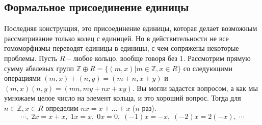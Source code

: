 \subsection{Формальное присоединение единицы}
Последняя конструкция, это присоединение единицы, которая делает возможным
рассматривание только колец с единицей. Но в действительности не все
гомоморфизмы переводят единицы в единицы, с чем сопряжены некоторые проблемы.
Пусть $R$ – любое кольцо, вообще говоря без 1. Рассмотрим прямую сумму абелевых
групп $\mathbb{Z}\oplus R=\{(m,x)|m\in\mathbb{Z},x\in R\}$ со следующими
операциями $(m,x)+(n,y)=(m+n,x+y)$ и $(m,x)(n,y)=(mn, my+nx+xy)$. Вы могли
задастся вопросом, а как мы умножаем целое число на элемент кольца, и это
хороший вопрос. Тогда для $n\in\mathbb{Z},x\in R$ определим $nx=x+\ldots+x$ ($n$
раз). 
\[
    \cdots,\;
    2x=x+x,\;
    1x=x,\;
    0x=0,\;
    (-1)x=-x,\;
    (-2)x=2(-x),\;
    \cdots
\]

